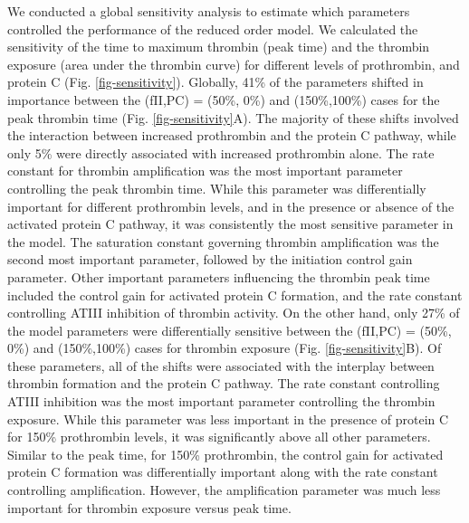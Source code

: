 \documentclass[processes,article,received,moreauthors,pdftex,12pt,a4paper]{mdpi}
\begin{document}
We conducted a global sensitivity analysis to estimate which parameters controlled the performance of the reduced order model. 
We calculated the sensitivity of the time to maximum thrombin (peak time) and the thrombin exposure (area under the thrombin curve) 
for different levels of prothrombin, and protein C (Fig. \ref{fig-sensitivity}). 
Globally, 41\% of the parameters shifted in importance between the (fII,PC) = (50\%, 0\%) and (150\%,100\%) cases for the peak thrombin time (Fig. \ref{fig-sensitivity}A). 
The majority of these shifts involved the interaction between increased prothrombin and the protein C pathway, while only
5\% were directly associated with increased prothrombin alone. The rate constant for thrombin amplification was the most important parameter controlling the
peak thrombin time. While this parameter was differentially important for different prothrombin levels, and in the presence or absence of 
the activated protein C pathway, it was consistently the most sensitive parameter in the model. The saturation constant governing thrombin amplification was
the second most important parameter, followed by the initiation control gain parameter. Other important parameters influencing the thrombin peak time included the control gain for
activated protein C formation, and the rate constant controlling ATIII inhibition of thrombin activity. 
On the other hand, only 27\% of the model parameters were differentially sensitive between the (fII,PC) = (50\%, 0\%) and (150\%,100\%) cases 
for thrombin exposure (Fig. \ref{fig-sensitivity}B). Of these parameters, all of the shifts were associated with the interplay between thrombin formation and the protein C pathway. 
The rate constant controlling ATIII inhibition was the most important parameter controlling the thrombin exposure.
While this parameter was less important in the presence of protein C for 150\% prothrombin levels, it was significantly above all other parameters. 
Similar to the peak time, for 150\% prothrombin, the control gain for activated protein C formation was differentially important along with the rate constant controlling
amplification. However, the amplification parameter was much less important for thrombin exposure versus peak time. 
\end{document}
